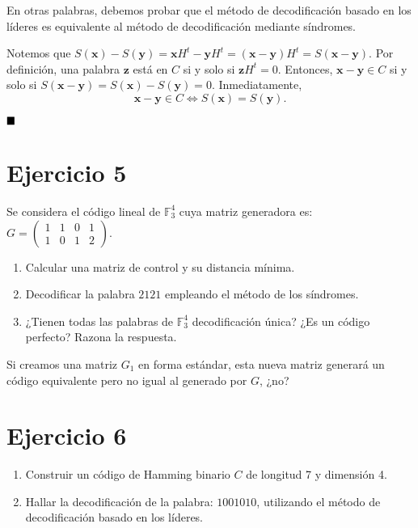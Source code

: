 En otras palabras, debemos probar que el método de decodificación basado en los líderes es equivalente al método de decodificación mediante síndromes.

Notemos que $S(\textbf{x}) - S(\textbf{y}) = \textbf{x}H^t - \textbf{y}H^t = (\textbf{x} - \textbf{y})H^t = S(\textbf{x}-\textbf{y})$. Por definición, una palabra $\textbf{z}$ está en $C$ si y solo si $\textbf{z}H^t = 0$. Entonces, $\textbf{x} - \textbf{y} \in C$ si y solo si $S(\textbf{x}-\textbf{y}) = S(\textbf{x}) - S(\textbf{y}) = 0$. Inmediatamente, \[\textbf{x}-\textbf{y} \in C \iff S(\textbf{x}) = S(\textbf{y}).\]

$\qed$

\section{Ejercicio 5}

\begin{formulationBox}
	Se considera el código lineal de $\mathbb{F}_3^4$ cuya matriz generadora es: $G = \begin{pmatrix}
		1 & 1 & 0 & 1 \\
		1 & 0 & 1 & 2
	\end{pmatrix}$.
	
	\begin{enumerate}[label=\alph*)]
		\item Calcular una matriz de control y su distancia mínima.
		\item Decodificar la palabra $2121$ empleando el método de los síndromes.
		\item ¿Tienen todas las palabras de $\mathbb{F}_3^4$ decodificación única? ¿Es un código perfecto? Razona la respuesta.
	\end{enumerate}
\end{formulationBox}

\begin{doubtBox}
	Si creamos una matriz $G_1$ en forma estándar, esta nueva matriz generará un código equivalente pero no igual al generado por $G$, ¿no?
\end{doubtBox}

\section{Ejercicio 6}

\begin{formulationBox}
	\begin{enumerate}[label=\alph*)]
		\item Construir un código de Hamming binario $C$ de longitud 7 y dimensión 4.
		\item Hallar la decodificación de la palabra: $1001010$, utilizando el método de decodificación basado en los líderes.
	\end{enumerate}
\end{formulationBox}

